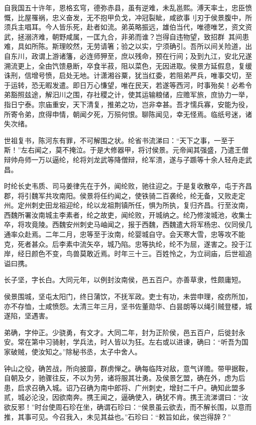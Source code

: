 \documentclass[12pt,UTF8]{ctexbook}
\begin{document}
自我国五十许年，恩格玄穹，德弥赤县，虽有逆难，未乱邕熙。溥天率土，忠臣愤慨，比屋罹祸，忠义奋发，无不抱甲负戈，冲冠裂眦，咸欲事刂刃于侯景腹中，所须兵主唱耳。今人皆乐死，赴者如流。弟英略振远，雄伯当代，唯德唯艺，资文资武，拯溺济难，朝野咸属，一匡九合，非弟而谁？岂得自违物望，致招群！其间患难，具如所陈。斯理皎然，无劳请箸；验之以实，宁须确引。吾所以间关险道，出自东川，政谓上游诸籓，必连师狎至，庶以残命，预在行间；及到九江，安北兄遂溯流更上，全由饩馈悬断，卒食半菽，阻以菜色，无因进取。侯景方延假息，复缓诛刑，信增号愤，启处无地。计潇湘谷粟，犹当红委，若阻弟严兵，唯事交切，至于运转，恐无暇发遣。即日万心慊望，唯在民天，若遂等西河，时事殆矣！必希令弟豁照兹途，解汨川之围，存社稷之计，使其运输粮储，应赡军旅，庶协力一举，指日宁泰。宗庙重安，天下清复，推弟之功，岂非幸甚。吾才懦兵寡，安能为役，所寄令弟，庶得申情，朝闻夕死，万殒何恨。聊陈闻见，幸无怪焉。临纸号迷，诸失次绪。

世祖复书，陈河东有罪，不可解围之状。纶省书流涕曰：“天下之事，一至于斯！”左右闻之，莫不掩泣。于是大修器甲，将讨侯景。元帝闻其强盛，乃遣王僧辩帅舟师一万以逼纶，纶将刘龙武等降僧辩，纶军溃，遂与子踬等十余人轻舟走武昌。

时纶长史韦质、司马姜律先在于外，闻纶败，驰往迎之。于是复收散卒，屯于齐昌郡，将引魏军共攻南阳。侯景将任约闻之，使铁骑二百袭纶，纶无备，又败走定州。定州刺史田龙祖迎纶，纶以龙祖荆镇所任，惧为所执，复归齐昌。行至汝南，西魏所署汝南城主李素者，纶之故吏，闻纶败，开城纳之。纶乃修浚城池，收集士卒，将攻竟陵。西魏安州刺史马岫闻之，报于西魏，西魏遣大将军杨忠、仪同侯几通率众赴焉。二年二月，忠等至于汝南，纶婴城自守。会天寒大雪，忠等攻不能克，死者甚众。后李素中流矢卒，城乃陷。忠等执纶，纶不为屈，遂害之。投于江岸，经日颜色不变，鸟兽莫敢近焉。时年三十三。百姓怜之，为立祠庙，后世祖追谥曰携。

长子坚，字长白。大同元年，以例封汝南侯，邑五百户。亦善草隶，性颇庸短。

侯景围城，坚屯太阳门，终日蒲饮，不抚军政。吏士有功，未尝申理，疫疠所加，亦不存恤，士咸愤怨。太清三年三月，坚书佐董勋华、白昙朗等以绳引贼登楼，城遂陷，坚遇害。

弟确，字仲正。少骁勇，有文才。大同二年，封为正阶侯，邑五百户，后徙封永安。常在第中习骑射，学兵法，时人皆以为狂。左右或以进谏，确曰：“听吾为国家破贼，使汝知之。”除秘书丞，太子中舍人。

钟山之役，确苦战，所向披靡，群虏惮之。确每临阵对敌，意气详赡。带甲据鞍，自朝及夕，驰骤往反，不以为劳，诸将服其壮勇。及侯景乞盟，确在外，虑为后患，启求召确入城。诏乃召确为南中郎将、广州刺史，增封二千户。确知此盟多贰，城必沦没，因欲南奔。携王闻之，逼确使入，确犹不肯。携王流涕谓曰：“汝欲反邪！”时台使周石珍在坐，确谓石珍曰：“侯景虽云欲去，而不解长围，以意而推，其事可见。今召我入，未见其益也。”石珍曰：“敕旨如此，侯岂得辞？”
\end{document}
